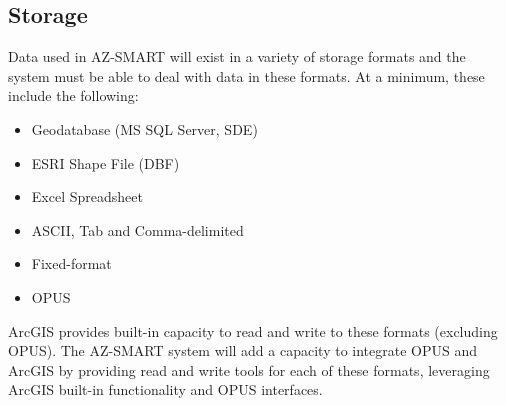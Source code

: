 \subsection{Storage}
Data used in AZ-SMART will exist in a variety of storage formats and
the system must be able to deal with data in these formats.  At a
minimum, these include the following:

\begin{itemize}
\item Geodatabase (MS SQL Server, SDE)
\item ESRI Shape File (DBF)
\item Excel Spreadsheet
\item ASCII, Tab and Comma-delimited
\item Fixed-format
\item OPUS
\end{itemize}

ArcGIS provides built-in capacity to read and write to these formats
(excluding OPUS).  The AZ-SMART system will add a capacity to integrate
OPUS and ArcGIS by providing read and write tools for each of these
formats, leveraging ArcGIS built-in functionality and OPUS interfaces.
